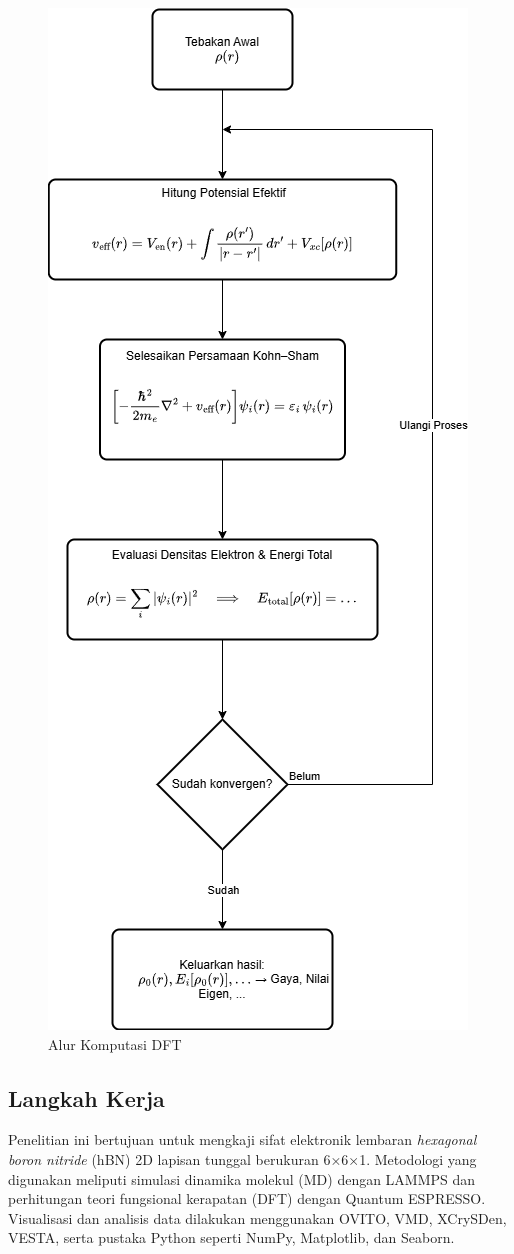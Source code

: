 \begin{figure}
    \centering
    \includegraphics[width=0.5\linewidth]{gambar/DFT.drawio.png}
    \caption{Alur Komputasi DFT }
    \label{fig:enter-label}
\end{figure}

\subsection{Langkah Kerja}
\label{sec:intro}
Penelitian ini bertujuan untuk mengkaji sifat elektronik lembaran \textit{hexagonal boron nitride} (hBN) 2D lapisan tunggal berukuran 6×6×1. Metodologi yang digunakan meliputi simulasi dinamika molekul (MD) dengan LAMMPS dan perhitungan teori fungsional kerapatan (DFT) dengan Quantum ESPRESSO. Visualisasi dan analisis data dilakukan menggunakan OVITO, VMD, XCrySDen, VESTA, serta pustaka Python seperti NumPy, Matplotlib, dan Seaborn.

